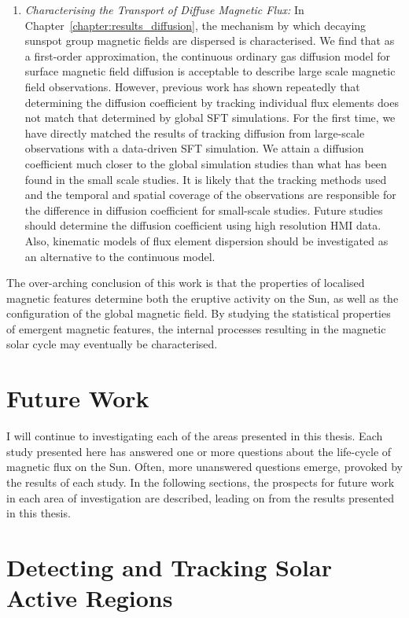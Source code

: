 \begin{enumerate}
\item \emph{Characterising the Transport of Diffuse Magnetic Flux:} In Chapter~\ref{chapter:results_diffusion}, the mechanism by which decaying sunspot group magnetic fields are dispersed is characterised. We find that as a first-order approximation, the continuous ordinary gas diffusion model for surface magnetic field diffusion is acceptable to describe large scale magnetic field observations. However, previous work has shown repeatedly that determining the diffusion coefficient by tracking individual flux elements does not match that determined by global \gls{SFT} simulations. For the first time, we have directly matched the results of tracking diffusion from large-scale observations with a data-driven \gls{SFT} simulation. We attain a diffusion coefficient much closer to the global simulation studies than what has been found in the small scale studies. It is likely that the tracking methods used and the temporal and spatial coverage of the observations are responsible for the difference in diffusion coefficient for small-scale studies. Future  studies should determine the diffusion coefficient using high resolution \gls{HMI} data. Also, kinematic models of flux element dispersion should be investigated as an alternative to the continuous model.
\end{enumerate}
The over-arching conclusion of this work is that the properties of localised magnetic features determine both the eruptive activity on the Sun, as well as the configuration of the global magnetic field. By studying the statistical properties of emergent magnetic features, the internal processes resulting in the magnetic solar cycle may eventually be characterised.

\section{Future Work}

I will continue to investigating each of the areas presented in this thesis. Each study presented here has answered one or more questions about the life-cycle of magnetic flux on the Sun. Often, more unanswered questions emerge, provoked by the results of each study. In the following sections, the prospects for future work in each area of investigation are described, leading on from the results presented in this thesis. 

\section{Detecting and Tracking Solar Active Regions}\label{sect:detecttracksolarar}

